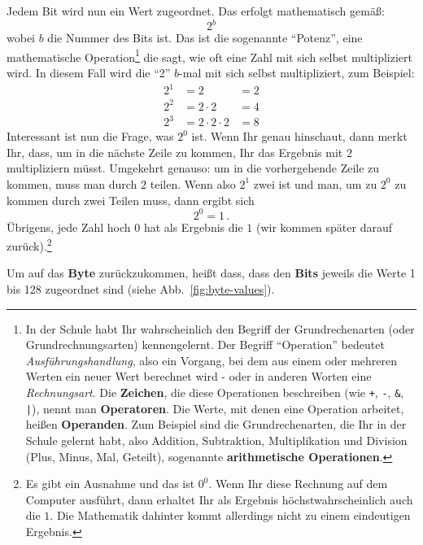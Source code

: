 \noindent
Jedem Bit wird nun ein Wert zugeordnet. Das erfolgt mathematisch gemäß:
\begin{equation*}
  2^b
\end{equation*}
wobei $b$ die Nummer des Bits ist. Das ist die sogenannte ``Potenz'', eine mathematische Operation\footnote{%
  In der Schule habt Ihr wahrscheinlich den Begriff der Grundrechenarten (oder Grundrechnungsarten) kennengelernt. Der Begriff ``Operation'' bedeutet \emph{Ausführungshandlung}, also ein Vorgang, bei dem aus einem oder mehreren Werten ein neuer Wert berechnet wird - oder in anderen Worten eine \emph{Rechnungsart}. Die \textbf{Zeichen}, die diese Operationen beschreiben (wie \texttt{+}, \texttt{-}, \texttt{\&}, \texttt{|}), nennt man \textbf{Operatoren}. Die Werte, mit denen eine Operation arbeitet, heißen \textbf{Operanden}. Zum Beispiel sind die Grundrechenarten, die Ihr in der Schule gelernt habt, also Addition, Subtraktion, Multiplikation und Division (Plus, Minus, Mal, Geteilt), sogenannte \textbf{arithmetische Operationen}.}
die sagt, wie oft eine Zahl mit sich selbst multipliziert wird. In diesem Fall wird die ``2'' $b$-mal mit sich selbst multipliziert, zum Beispiel:
\begin{align*}
  2^1 &= 2              &= 2\\
  2^2 &= 2\cdot2        &= 4\\
  2^3 &= 2\cdot2\cdot2  &= 8
\end{align*}
Interessant ist nun die Frage, was $2^0$ ist. Wenn Ihr genau hinschaut, dann merkt Ihr, dass, um in die nächste Zeile zu kommen, Ihr das Ergebnis mit $2$ multipliziern müsst. Umgekehrt genauso: um in die vorhergehende Zeile zu kommen, muss man durch $2$ teilen. Wenn also $2^1$ zwei ist und man, um zu $2^0$ zu kommen durch zwei Teilen muss, dann ergibt sich
\begin{equation*}
  2^0 = 1\,.
\end{equation*}
Übrigens, jede Zahl hoch $0$ hat als Ergebnis die $1$ (wir kommen später darauf zurück).\footnote{%
  Es gibt ein Ausnahme und das ist $0^0$. Wenn Ihr diese Rechnung auf dem Computer ausführt, dann erhaltet Ihr als Ergebnis höchstwahrscheinlich auch die $1$. Die Mathematik dahinter kommt allerdings nicht zu einem eindeutigen Ergebnis.}

Um auf das \textbf{Byte} zurückzukommen, heißt dass, dass den \textbf{Bits} jeweils die Werte 1 bis 128 zugeordnet sind (siehe Abb.~\ref{fig:byte-values}).

